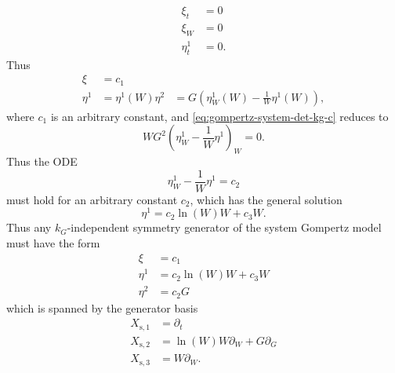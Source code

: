 \begin{align}
  \xi_t &= 0\\
  \xi_W &= 0\\
  \eta^1_t &= 0.
\end{align}
Thus
\begin{align}
  \xi &= c_1\\
  \eta^1 &= \eta^1(W)
  \eta^2 &= G \left(\eta^1_W(W) - \frac{1}{W} \eta^1(W) \right),
\end{align}
where \(c_1\) is an arbitrary constant, and \cref{eq:gompertz-system-det-kg-c} reduces to
\begin{equation}
  W G^2 \left(\eta^1_W - \frac{1}{W} \eta^1 \right)_W = 0.
\end{equation}
Thus the ODE
\begin{equation}
  \eta^1_W - \frac{1}{W} \eta^1 = c_2
\end{equation}
must hold for an arbitrary constant \(c_2\), which has the general solution
\begin{equation}
  \eta^1 = c_2 \ln(W) W + c_3 W.
\end{equation}
Thus any \(k_G\)-independent symmetry generator of the system Gompertz model  must have the form
\begin{align}
  \xi &= c_1 \\
  \eta^1 &= c_2 \ln(W) W + c_3 W\\
  \eta^2 &= c_2 G
\end{align}
which is spanned by the generator basis
\begin{align}
  X_{\text{s},1} &= \partial_t \\
  X_{\text{s},2} &= \ln(W) W \partial_W + G \partial_G \\
  X_{\text{s},3} &= W \partial_W.
\end{align}
